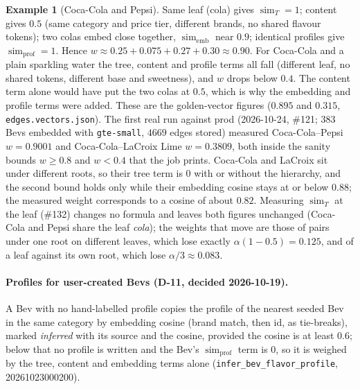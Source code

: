 \documentclass[11pt]{article}
\DeclareMathOperator{\simi}{sim}
\newcommand{\code}[1]{\texttt{#1}}
\theoremstyle{plain}
\theoremstyle{definition}
\newtheorem{example}[theorem]{Example}
\theoremstyle{remark}
\begin{document}
\begin{example}[Coca-Cola and Pepsi]
Same leaf (cola) gives $\simi_T = 1$; content gives $0.5$ (same category and price tier, different brands, no shared flavour tokens); two colas embed close together, $\simi_{\mathrm{emb}}$ near $0.9$; identical profiles give $\simi_{\mathrm{prof}} = 1$. Hence $w \approx 0.25 + 0.075 + 0.27 + 0.30 \approx 0.90$. For Coca-Cola and a plain sparkling water the tree, content and profile terms all fall (different leaf, no shared tokens, different base and sweetness), and $w$ drops below $0.4$. The content term alone would have put the two colas at $0.5$, which is why the embedding and profile terms were added. These are the golden-vector figures ($0.895$ and $0.315$, \code{edges.vectors.json}). The first real run against prod (2026-10-24, \#121; $383$ Bevs embedded with \code{gte-small}, $4669$ edges stored) measured Coca-Cola--Pepsi $w = 0.9001$ and Coca-Cola--LaCroix Lime $w = 0.3809$, both inside the sanity bounds $w \ge 0.8$ and $w < 0.4$ that the job prints. Coca-Cola and LaCroix sit under different roots, so their tree term is $0$ with or without the hierarchy, and the second bound holds only while their embedding cosine stays at or below $0.88$; the measured weight corresponds to a cosine of about $0.82$. Measuring $\simi_T$ at the leaf (\#132) changes no formula and leaves both figures unchanged (Coca-Cola and Pepsi share the leaf \emph{cola}); the weights that move are those of pairs under one root on different leaves, which lose exactly $\alpha(1 - 0.5) = 0.125$, and of a leaf against its own root, which lose $\alpha/3 \approx 0.083$.
\end{example}

\paragraph{Profiles for user-created Bevs (D-11, decided 2026-10-19).} A Bev with no hand-labelled profile copies the profile of the nearest seeded Bev in the same category by embedding cosine (brand match, then id, as tie-breaks), marked \emph{inferred} with its source and the cosine, provided the cosine is at least $0.6$; below that no profile is written and the Bev's $\simi_{\mathrm{prof}}$ term is $0$, so it is weighed by the tree, content and embedding terms alone (\code{infer\_bev\_flavor\_profile}, 20261023000200).
\end{document}
